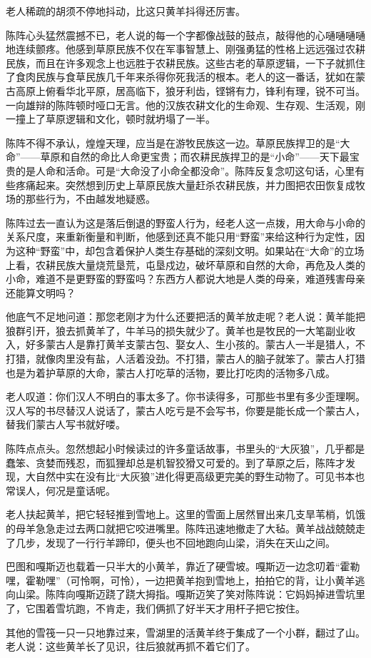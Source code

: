 \par 老人稀疏的胡须不停地抖动，比这只黄羊抖得还厉害。
\par 陈阵心头猛然震撼不已，老人说的每一个字都像战鼓的鼓点，敲得他的心嗵嗵嗵嗵地连续颤疼。他感到草原民族不仅在军事智慧上、刚强勇猛的性格上远远强过农耕民族，而且在许多观念上也远胜于农耕民族。这些古老的草原逻辑，一下子就抓住了食肉民族与食草民族几千年来杀得你死我活的根本。老人的这一番话，犹如在蒙古高原上俯看华北平原，居高临下，狼牙利齿，铿锵有力，锋利有理，锐不可当。一向雄辩的陈阵顿时哑口无言。他的汉族农耕文化的生命观、生存观、生活观，刚一撞上了草原逻辑和文化，顿时就坍塌了一半。
\par 陈阵不得不承认，煌煌天理，应当是在游牧民族这一边。草原民族捍卫的是“大命”——草原和自然的命比人命更宝贵；而农耕民族捍卫的是“小命”——天下最宝贵的是人命和活命。可是“大命没了小命全都没命”。陈阵反复念叨这句话，心里有些疼痛起来。突然想到历史上草原民族大量赶杀农耕民族，并力图把农田恢复成牧场的那些行为，不由越发地疑惑。
\par 陈阵过去一直认为这是落后倒退的野蛮人行为，经老人这一点拨，用大命与小命的关系尺度，来重新衡量和判断，他感到还真不能只用“野蛮”来给这种行为定性，因为这种“野蛮”中，却包含着保护人类生存基础的深刻文明。如果站在“大命”的立场上看，农耕民族大量烧荒垦荒，屯垦戍边，破坏草原和自然的大命，再危及人类的小命，难道不是更野蛮的野蛮吗？东西方人都说大地是人类的母亲，难道残害母亲还能算文明吗？
\par 他底气不足地问道：那您老刚才为什么还要把活的黄羊放走呢？老人说：黄羊能把狼群引开，狼去抓黄羊了，牛羊马的损失就少了。黄羊也是牧民的一大笔副业收入，好多蒙古人是靠打黄羊支蒙古包、娶女人、生小孩的。蒙古人一半是猎人，不打猎，就像肉里没有盐，人活着没劲。不打猎，蒙古人的脑子就笨了。蒙古人打猎也是为着护草原的大命，蒙古人打吃草的活物，要比打吃肉的活物多八成。
\par 老人叹道：你们汉人不明白的事太多了。你书读得多，可那些书里有多少歪理啊。汉人写的书尽替汉人说话了，蒙古人吃亏是不会写书，你要是能长成一个蒙古人，替我们蒙古人写书就好喽。
\par 陈阵点点头。忽然想起小时候读过的许多童话故事，书里头的“大灰狼”，几乎都是蠢笨、贪婪而残忍，而狐狸却总是机智狡猾又可爱的。到了草原之后，陈阵才发现，大自然中实在没有比“大灰狼”进化得更高级更完美的野生动物了。可见书本也常误人，何况是童话呢。
\par 老人扶起黄羊，把它轻轻推到雪地上。这里的雪面上居然冒出来几支旱苇梢，饥饿的母羊急急走过去两口就把它咬进嘴里。陈阵迅速地撤走了大毡。黄羊战战兢兢走了几步，发现了一行行羊蹄印，便头也不回地跑向山梁，消失在天山之间。
\par 巴图和嘎斯迈也载着一只半大的小黄羊，靠近了硬雪坡。嘎斯迈一边念叨着“霍勒嘿，霍勒嘿”（可怜啊，可怜），一边把黄羊抱到雪地上，拍拍它的背，让小黄羊逃向山梁。陈阵向嘎斯迈跷了跷大拇指。嘎斯迈笑了笑对陈阵说：它妈妈掉进雪坑里了，它围着雪坑跑，不肯走，我们俩抓了好半天才用杆子把它按住。
\par 其他的雪筏一只一只地靠过来，雪湖里的活黄羊终于集成了一个小群，翻过了山。老人说：这些黄羊长了见识，往后狼就再抓不着它们了。


